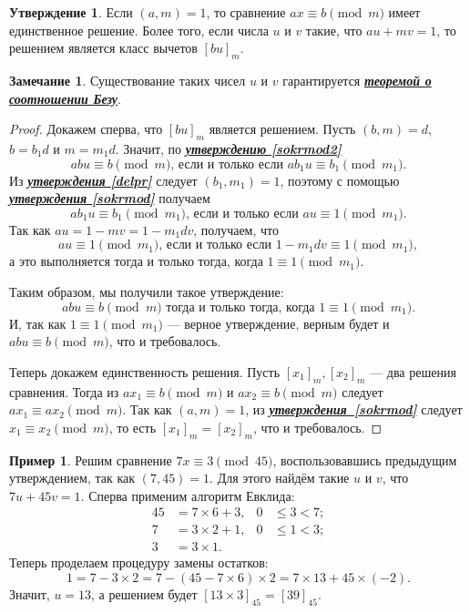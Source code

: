 \documentclass[14pt, a4paper]{extarticle}
\theoremstyle{definition}
\newtheorem*{remark}{Замечание}
\newtheorem{example}{Пример}
\newtheorem{statement}{Утверждение}
\begin{document}
	\begin{statement}
	\label{sol}
		Если $(a,m)=1$, то сравнение $ax\equiv b\pmod{m}$ имеет единственное решение. Более того, если числа $u$ и $v$ такие, что $au+mv=1$, то решением является класс вычетов $[bu]_m$.
	\end{statement}
	\begin{remark}
		Существование таких чисел $u$ и $v$ гарантируется \hyperref[bezu]{\textbf{\textit{теоремой о соотношении Безу}}}.
	\end{remark}
	\begin{proof}
		Докажем сперва, что $[bu]_m$ является решением. Пусть $(b,m)=d$, $b=b_1d$ и $m=m_1d$. Значит, по \hyperref[sokrmod2]{\textbf{\textit{утверждению \ref*{sokrmod2}}}}
		$$\boxed{abu\equiv b\pmod{m}\text{, если и только если }ab_1u\equiv b_1\pmod{m_1}}.$$
		Из \hyperref[delpr]{\textbf{\textit{утверждения \ref*{delpr}}}} следует $(b_1,m_1)=1$, поэтому с помощью \hyperref[sokrmod]{\textbf{\textit{утверждения \ref*{sokrmod}}}} получаем
		$$\boxed{ab_1u\equiv b_1\pmod{m_1}\text{, если и только если }au\equiv1\pmod{m_1}}.$$
		Так как $au=1-mv=1-m_1dv$, получаем, что
		$$\boxed{au\equiv1\pmod{m_1}\text{, если и только если }1-m_1dv\equiv1\pmod{m_1}},$$
		а это выполняется тогда и только тогда, когда $\boxed{1\equiv1\pmod{m_1}}$.
		
		Таким образом, мы получили такое утверждение:
		$$\boxed{abu\equiv b\pmod{m}\text{ тогда и только тогда, когда }1\equiv1\pmod{m_1}}.$$
		И, так как $1\equiv1\pmod{m_1}$ --- верное утверждение, верным будет и $abu\equiv b\pmod{m}$, что и требовалось.
		
		Теперь докажем единственность решения. Пусть $[x_1]_m, [x_2]_m$ --- два решения сравнения. Тогда из $ax_1\equiv b\pmod{m}$ и $ax_2\equiv b\pmod{m}$ следует $ax_1\equiv ax_2\pmod{m}$. Так как $(a,m)=1$, из \hyperref[sokrmod]{\textbf{\textit{утверждения~\ref*{sokrmod}}}} следует $x_1\equiv x_2\pmod{m}$, то есть $[x_1]_m=[x_2]_m$, что и требовалось.
	\end{proof}

	\begin{example}
		Решим сравнение $7x\equiv3\pmod{45}$, воспользовавшись предыдущим утверждением, так как $(7,45)=1$. Для этого найдём такие $u$ и $v$, что $7u+45v=1$. Сперва применим алгоритм Евклида:
		\begin{align*}
			45&=7\times6+3,&0&\leqslant3<7;\\
			7&=3\times2+1,&0&\leqslant1<3;\\
			3&=3\times1.
		\end{align*}
		Теперь проделаем процедуру замены остатков:
		$$\boxed{1=}7-3\times2=7-(45-7\times6)\times2=\boxed{7\times13+45\times(-2)}.$$
		Значит, $u=13$, а решением будет $[13\times3]_{45}=[39]_{45}$.
	\end{example}
\end{document}
